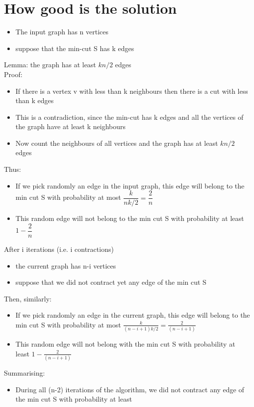 \documentclass{article}[18pt]
\begin{document}
\section{How good is the solution}
\begin{itemize}
	\item The input graph has n vertices
	\item suppose that the min-cut S has k edges
\end{itemize}
Lemma: the graph has at least $kn/2$ edges\\
Proof:
\begin{itemize}
	\item If there is a vertex v with less than k neighbours then there is a cut with less than k edges
	\item This is a contradiction, since the min-cut has k edges and all the vertices of the graph have at least k neighbours
	\item Now count the neighbours of all vertices and the graph has at least $kn/2$ edges
\end{itemize}
Thus:
\begin{itemize}
	\item If we pick randomly an edge in the input graph, this edge will belong to the min cut S with probability at most $\dfrac{k}{nk/2}=\dfrac{2}{n}$
	\item This random edge will not belong to the min cut S with probability at least $1-\dfrac{2}{n}$
\end{itemize}
After i iterations (i.e. i contractions)
\begin{itemize}
	\item the current graph has n-i vertices
	\item suppose that we did not contract yet any edge of the min cut S
\end{itemize}
Then, similarly:
\begin{itemize}
	\item If we pick randomly an edge in the current graph, this edge will belong to the min cut S with probability at most $\frac { k } { ( n - i + 1 ) k / 2 } = \frac { 2 } { ( n - i + 1 ) }$
	\item This random edge will not belong with the min cut S with probability at least $1 - \frac { 2 } { ( n - i + 1 ) }$
\end{itemize}
Summarising:
\begin{itemize}
	\item During all (n-2) iterations of the algorithm, we did not contract any edge of the min cut S with probability at least
\end{itemize}
\end{document}
